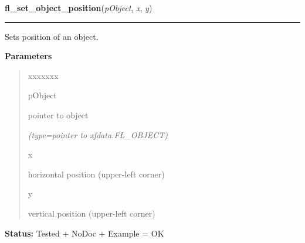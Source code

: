 \hspace{.8\funcindent}\begin{boxedminipage}{\funcwidth}

    \raggedright \textbf{fl\_set\_object\_position}(\textit{pObject}, \textit{x}, \textit{y})

    \vspace{-1.5ex}

    \rule{\textwidth}{0.5\fboxrule}
\setlength{\parskip}{2ex}
    Sets position of an object.

\setlength{\parskip}{1ex}
      \textbf{Parameters}
      \vspace{-1ex}

      \begin{quote}
        \begin{Ventry}{xxxxxxx}

          \item[pObject]

          pointer to object

            {\it (type=pointer to xfdata.FL\_OBJECT)}

          \item[x]

          horizontal position (upper-left corner)

          \item[y]

          vertical position (upper-left corner)

        \end{Ventry}

      \end{quote}

\textbf{Status:} Tested + NoDoc + Example = OK



    \end{boxedminipage}

    \label{xformslib:library:fl_get_object_size}

    \vspace{0.5ex}

